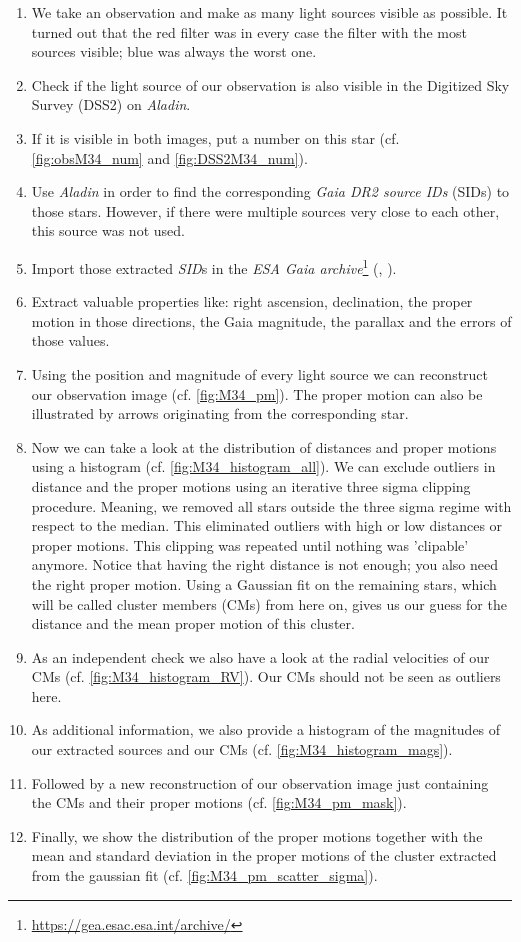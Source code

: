 \documentclass{article}
\begin{document}
\begin{enumerate}
\item We take an observation and make as many light sources visible as possible. It turned out that the red filter was in every case the filter with the most sources visible; blue was always the worst one.
\item Check if the light source of our observation is also visible in the Digitized Sky Survey (DSS2) on \textit{Aladin}\cite{Boch2014}.
\item If it is visible in both images, put a number on this star (cf. \ref{fig:obsM34_num} and \ref{fig:DSS2M34_num}).
\item Use \textit{Aladin} in order to find the corresponding \textit{Gaia DR2 source IDs} (SIDs) to those stars. However, if there were multiple sources very close to each other, this source was not used.
\item Import those extracted \textit{SID}s in the \textit{ESA Gaia archive}\footnote{\url{https://gea.esac.esa.int/archive/}} (\cite{Gaia2016}, \cite{Gaia2018}).
\item Extract valuable properties like: right ascension, declination, the proper motion in those directions, the Gaia magnitude, the parallax and the errors of those values.
\item Using the position and magnitude of every light source we can reconstruct our observation image (cf. \ref{fig:M34_pm}). The proper motion can also be illustrated by arrows originating from the corresponding star.
\item Now we can take a look at the distribution of distances and proper motions using a histogram (cf. \ref{fig:M34_histogram_all}). We can exclude outliers in distance and the proper motions using an iterative three sigma clipping procedure. Meaning, we removed all stars outside the three sigma regime with respect to the median. This eliminated outliers with high or low distances or proper motions. This clipping was repeated until nothing was 'clipable' anymore. Notice that having the right distance is not enough; you also need the right proper motion. Using a Gaussian fit on the remaining stars, which will be called cluster members (CMs) from here on, gives us our guess for the distance and the mean proper motion of this cluster.
\item As an independent check we also have a look at the radial velocities of our CMs (cf. \ref{fig:M34_histogram_RV}). Our CMs should not be seen as outliers here.
\item As additional information, we also provide a histogram of the magnitudes of our extracted sources and our CMs (cf. \ref{fig:M34_histogram_mags}).
\item Followed by a new reconstruction of our observation image just containing the CMs and their proper motions (cf. \ref{fig:M34_pm_mask}). 
\item Finally, we show the distribution of the proper motions together with the mean and standard deviation in the proper motions of the cluster extracted from the gaussian fit (cf. \ref{fig:M34_pm_scatter_sigma}).
\end{enumerate}
\end{document}
